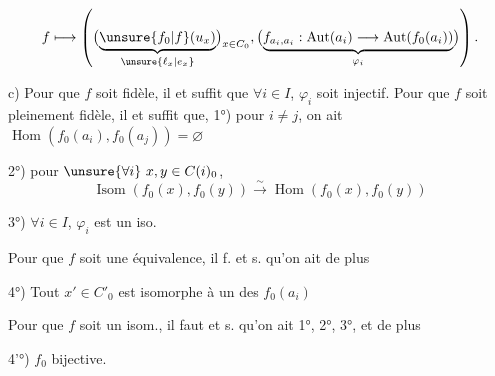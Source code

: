 \[
f\longmapsto\left(
\bigl(\underbrace{\unsure{f_0|f}(u_x)}_{\unsure{\ell_x|e_x}}\bigr)_{x\in C_0},
\bigl(\underbrace{f_{a_i,a_i}:\operatorname{Aut}(a_i)\longrightarrow\operatorname{Aut}(f_0(a_i))}_{\varphi_i}\bigr)
\right).
\]

c) Pour que $f$ soit fidèle, il  et
suffit que $\forall i\in I$, $\varphi_i$ soit injectif.
Pour que $f$ soit pleinement fidèle,
il  et suffit que, 1°) pour $i\ne j$,
on ait $\operatorname{Hom}(f_0(a_i),f_0(a_j))=\varnothing$

2°) pour $\unsure{\forall i}\ x,y\in C(i)_0$,
\[
\operatorname{Isom}(f_0(x),f_0(y))\xrightarrow{\sim}\operatorname{Hom}(f_0(x),f_0(y))
\]

3°) $\forall i\in I$, $\varphi_i$ est un iso.

Pour que $f$ soit une équivalence,
il f. et s. qu'on ait de plus

4°) Tout $x'\in C'_0$ est isomorphe
à un des $f_0(a_i)$

Pour que $f$ soit un isom.,
il faut et s. qu'on ait 1°, 2°, 3°,
et de plus

4'°) $f_0$ bijective.
